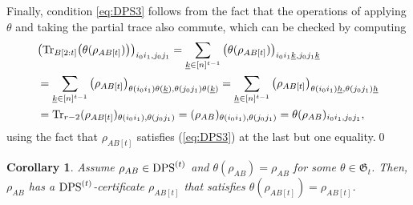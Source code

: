 \documentclass[11pt]{article}
\makeatletter
\newcommand{\Perm}{\mathfrak G}
\newcommand{\DPS}{\text{\rm DPS}}
\newcommand{\Tr}{\text{\rm Tr}}
\newcommand{\uk}{\underline{k}}
\newcommand{\uh}{\underline{h}}
\theoremstyle{plain}
\newtheorem{corollary}[satz]{Corollary}
\renewenvironment{proof}[1][\proofname]{%
  \par
  \pushQED{}%
  \normalfont
  \topsep6\p@\@plus6\p@
  \trivlist
  \item[\hskip\labelsep\itshape #1\@addpunct{.}]%
}{%
  \popQED
  \endtrivlist
}
\makeatother
\begin{document}
\begin{proof}
       Finally, condition \eqref{eq:DPS3} follows from the fact that the operations of applying $\theta$ and taking the partial trace also commute, which 
       can be checked   by computing
    \begin{align*}
   &     \big(\Tr_{B[2:t]}\big(\theta(\rho_{AB[t]})\big)\big)_{i_0i_1,j_0j_1}
  =\sum_{\uk\in [n]^{t-1}} \big(\theta(\rho_{AB[t]})\big)_{i_0i_1\uk, j_0j_1\uk}\\
  &= \sum_{\uk\in [n]^{t-1}} \big(\rho_{AB[t]}\big)_{\theta(i_0i_1)\theta(\uk),\theta(j_0j_1)\theta(\uk)}
  =\sum_{\uh\in [n]^{t-1}} \big(\rho_{AB[t]}\big)_{\theta(i_0i_1)\uh, \theta(j_0j_1)\uh} \\
    &      =\Tr_{r-2}(\rho_{AB[t]})_{\theta(i_0i_1),\theta(j_0j_1)}=(\rho_{AB})_{\theta(i_0i_1),\theta(j_0j_1)} 
           =\theta(\rho_{AB})_{i_0i_1,j_0j_1}, %
    \end{align*}
using the fact that $\rho_{AB[t]}$ satisfies (\ref{eq:DPS3}) at the last but one equality.\qed \end{proof}


\begin{corollary}\label{CThetaInvDPSCert}
 Assume $\rho_{AB}\in\DPS^{(t)}$ and $\theta(\rho_{AB})=\rho_{AB}$ for some $\theta\in\Perm_t$. 
 Then,  $\rho_{AB}$ has  a $\DPS^{(t)}$-certificate $\rho_{AB[t]}$ that satisfies 
  $\theta(\rho_{AB[t]})=\rho_{AB[t]}$.
\end{corollary}
\end{document}

